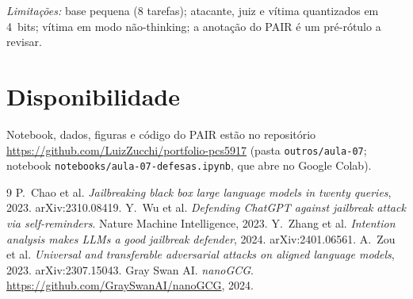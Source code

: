 \documentclass[10pt,twocolumn]{article}
\begin{document}
\emph{Limitações:} base pequena (8 tarefas); atacante, juiz e vítima quantizados em 4~bits;
vítima em modo não-thinking; a anotação do PAIR é um pré-rótulo a revisar.

\section*{Disponibilidade}
Notebook, dados, figuras e código do PAIR estão no repositório
\url{https://github.com/LuizZucchi/portfolio-pcs5917} (pasta \texttt{outros/aula-07}; notebook
\texttt{notebooks/aula-07-defesas.ipynb}, que abre no Google Colab).

\begin{thebibliography}{9}\small
{} P.\ Chao et al. \emph{Jailbreaking black box large language models in twenty queries}, 2023. arXiv:2310.08419.
 Y.\ Wu et al. \emph{Defending ChatGPT against jailbreak attack via self-reminders}. Nature Machine Intelligence, 2023.
 Y.\ Zhang et al. \emph{Intention analysis makes LLMs a good jailbreak defender}, 2024. arXiv:2401.06561.
 A.\ Zou et al. \emph{Universal and transferable adversarial attacks on aligned language models}, 2023. arXiv:2307.15043.
 Gray Swan AI. \emph{nanoGCG}. \url{https://github.com/GraySwanAI/nanoGCG}, 2024.
\end{thebibliography}
\end{document}
